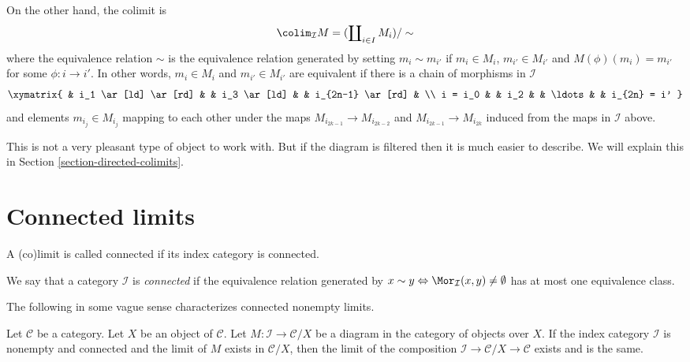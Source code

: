 \medskip\noindent
On the other hand, the colimit is
$$
\colim_\mathcal{I} M
=
(\coprod\nolimits_{i\in I} M_i)/\sim
$$
where the equivalence relation $\sim$ is the equivalence relation
generated by setting $m_i \sim m_{i'}$ if $m_i \in M_i$,
$m_{i'} \in M_{i'}$ and $M(\phi)(m_i) = m_{i'}$ for some
$\phi : i \to i'$. In other words, $m_i \in M_i$
and $m_{i'} \in M_{i'}$ are equivalent if there is a
chain of morphisms in $\mathcal{I}$
$$
\xymatrix{
&
i_1 \ar[ld] \ar[rd]
&
&
i_3 \ar[ld]
&
&
i_{2n-1} \ar[rd]
&
\\
i = i_0
&
&
i_2
&
&
\ldots
&
&
i_{2n} = i'
}
$$
and elements $m_{i_j} \in M_{i_j}$ mapping to each other under
the maps $M_{i_{2k-1}} \to M_{i_{2k-2}}$ and $M_{i_{2k-1}}
\to M_{i_{2k}}$ induced from the maps in $\mathcal{I}$ above.

\medskip\noindent
This is not a very pleasant type of object to work with.
But if the diagram is filtered then it is much easier to
describe. We will explain this in Section \ref{section-directed-colimits}.



\section{Connected limits}
\label{section-connected-limits}

\noindent
A (co)limit is called connected if its index category is connected.

\begin{definition}
\label{definition-category-connected}
We say that a category $\mathcal{I}$ is {\it connected}
if the equivalence relation generated by
$x \sim y \Leftrightarrow \Mor_\mathcal{I}(x, y) \not = \emptyset$
has at most one equivalence class.
\end{definition}

\noindent
The following in some vague sense characterizes connected nonempty limits.

\begin{lemma}
\label{lemma-connected-limit-over-X}
Let $\mathcal{C}$ be a category.
Let $X$ be an object of $\mathcal{C}$.
Let $M : \mathcal{I} \to \mathcal{C}/X$ be a diagram
in the category of objects over $X$.
If the index category $\mathcal{I}$ is nonempty and connected
and the limit of $M$ exists in $\mathcal{C}/X$,
then the limit of the composition
$\mathcal{I} \to \mathcal{C}/X \to \mathcal{C}$
exists and is the same.
\end{lemma}

